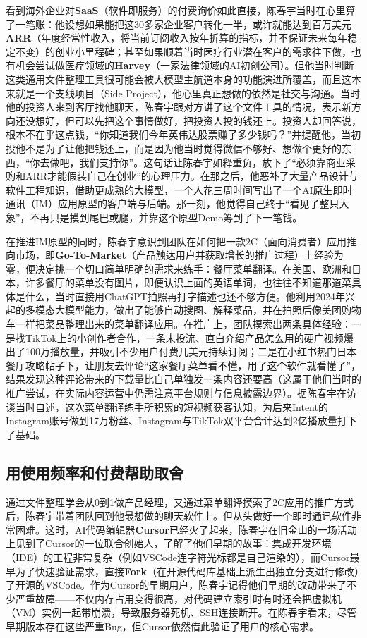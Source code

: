 \documentclass[UTF8,a4paper,11pt,fontset=fandol]{ctexart}
\begin{document}
看到海外企业对\textbf{SaaS}（软件即服务）的付费询价如此直接，陈春宇当时在心里算了一笔账：他设想如果能把这30多家企业客户转化一半，或许就能达到百万美元\textbf{ARR}（年度经常性收入，将当前订阅收入按年折算的指标，并不保证未来每年稳定不变）的创业小里程碑；甚至如果顺着当时医疗行业潜在客户的需求往下做，也有机会尝试做医疗领域的\textbf{Harvey}（一家法律领域的AI初创公司）。但他当时判断这类通用文件整理工具很可能会被大模型主航道本身的功能演进所覆盖，而且这本来就是一个支线项目（Side Project），他心里真正想做的依然是社交与沟通。当时他的投资人来到客厅找他聊天，陈春宇跟对方讲了这个文件工具的情况，表示新方向还没想好，但可以先把这个事情做好，把投资人投的钱还上。投资人却回答说，根本不在乎这点钱，“你知道我们今年英伟达股票赚了多少钱吗？”并提醒他，当初投他不是为了让他把钱还上，而是因为他当时觉得微信不够好、想做个更好的东西，“你去做吧，我们支持你”。这句话让陈春宇如释重负，放下了“必须靠商业采购和ARR才能假装自己在创业”的心理压力。在那之后，他恶补了大量产品设计与软件工程知识，借助更成熟的大模型，一个人花三周时间写出了一个AI原生即时通讯（IM）应用原型的客户端与后端。那一刻，他觉得自己终于“看见了整只大象”，不再只是摸到尾巴或腿，并靠这个原型Demo筹到了下一笔钱。

在推进IM原型的同时，陈春宇意识到团队在如何把一款2C（面向消费者）应用推向市场，即\textbf{Go-To-Market}（产品触达用户并获取增长的推广过程）上经验为零，便决定挑一个切口简单明确的需求来练手：餐厅菜单翻译。在美国、欧洲和日本，许多餐厅的菜单没有图片，即便认识上面的英语单词，也往往不知道那道菜具体是什么，当时直接用ChatGPT拍照再打字描述也还不够方便。他利用2024年兴起的多模态大模型能力，做出了能够自动搜图、解释菜品，并在拍照后像美团购物车一样把菜品整理出来的菜单翻译应用。在推广上，团队摸索出两条具体经验：一是找TikTok上的小创作者合作，一条未投流、直白介绍产品怎么用的硬广视频爆出了100万播放量，并吸引不少用户付费几美元持续订阅；二是在小红书热门日本餐厅攻略帖子下，让朋友去评论“这家餐厅菜单看不懂，用了这个软件就看懂了”，结果发现这种评论带来的下载量比自己单独发一条内容还要高（这属于他们当时的推广尝试，在实际内容运营中仍需注意平台规则与信息披露边界）。据陈春宇在访谈当时自述，这次菜单翻译练手所积累的短视频获客认知，为后来Intent的Instagram账号做到17万粉丝、Instagram与TikTok双平台合计达到2亿播放量打下了基础。

\subsection{用使用频率和付费帮助取舍}
通过文件整理学会从0到1做产品经理，又通过菜单翻译摸索了2C应用的推广方式后，陈春宇带着团队回到他最想做的聊天软件上。但从头做好一个即时通讯软件非常困难。这时，AI代码编辑器\textbf{Cursor}已经火了起来，陈春宇在旧金山的一场活动上见到了Cursor的一位联合创始人，了解了他们早期的故事：集成开发环境（IDE）的工程非常复杂（例如VSCode连字符光标都是自己渲染的），而Cursor最早为了快速验证需求，直接\textbf{Fork}（在开源代码库基础上派生出独立分支进行修改）了开源的VSCode。作为Cursor的早期用户，陈春宇记得他们早期的改动带来了不少严重故障——不仅内存占用变得很高，对代码建立索引时有时还会把虚拟机（VM）实例一起带崩溃，导致服务器死机、SSH连接断开。在陈春宇看来，尽管早期版本存在这些严重Bug，但Cursor依然借此验证了用户的核心需求。
\end{document}
